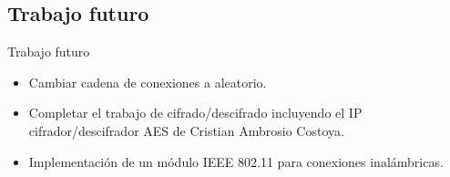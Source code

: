 \documentclass[aspectratio=169]{beamer}
\begin{document}
\subsection{Trabajo futuro}
\begin{frame}{Trabajo futuro}
\begin{itemize}
	\item Cambiar cadena de conexiones a aleatorio.
	\item Completar el trabajo de cifrado/descifrado incluyendo el IP cifrador/descifrador AES de Cristian Ambrosio Costoya.
	\item Implementación de un módulo IEEE 802.11 para conexiones inalámbricas.
\end{itemize}
\end{frame}
\end{document}
